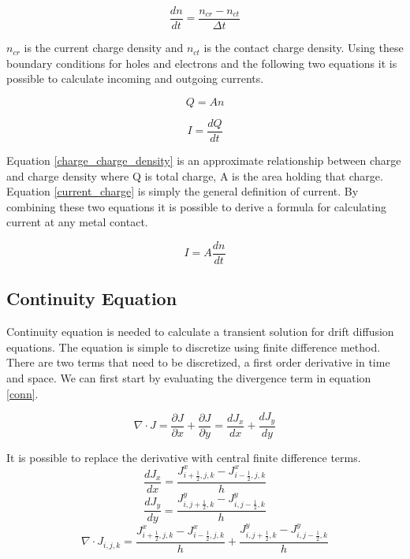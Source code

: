 \begin{equation}
\frac{dn}{dt}=\frac{n_{cr}-n_{ct}}{\Delta t}
\end{equation}

$n_{cr}$ is the current charge density and $n_{ct}$ is the contact charge density. Using these boundary conditions for holes and electrons and the following two equations it is possible to calculate incoming and outgoing currents. 

\begin{equation}
Q=An
\label{charge_charge_density}
\end{equation} 

\begin{equation}
I=\frac{dQ}{dt}
\label{current_charge}
\end{equation} 
 

Equation \ref{charge_charge_density} is an approximate relationship between charge and charge density where Q is total charge, A is the area holding that charge. Equation \ref{current_charge} is simply the general definition of current. By combining these two equations it is possible to derive a formula for calculating current at any metal contact.

\begin{equation}
I=A \frac{dn}{dt}
\label{current_charge_density}
\end{equation}


\clearpage
\subsection{Continuity Equation}
Continuity equation is needed to calculate a transient solution for drift diffusion equations. The equation is simple to discretize using finite difference method. There are two terms that need to be discretized, a first order derivative in time and space. We can first start by evaluating the divergence term in equation \eqref{conn}.

\begin{equation}
\nabla \cdot J=\frac{\partial J}{\partial x}+\frac{\partial J}{\partial y}=\frac{d J_x}{d x}+\frac{d J_y}{d y}
\end{equation}

It is possible to replace the derivative with central finite difference terms.
\begin{equation}
\frac{d J_x}{d x}=\frac{J^x_{i+\frac{1}{2},j,k}-J^x_{i-\frac{1}{2},j,k}}{h}
\end{equation}
\begin{equation}
\frac{d J_y}{d y}=\frac{J^y_{i,j+\frac{1}{2},k}-J^y_{i,j-\frac{1}{2},k}}{h}
\end{equation}
\begin{equation}
\nabla \cdot J_{i,j,k}=\frac{J^x_{i+\frac{1}{2},j,k}-J^x_{i-\frac{1}{2},j,k}}{h}+\frac{J^y_{i,j+\frac{1}{2},k}-J^y_{i,j-\frac{1}{2},k}}{h}
\end{equation}

